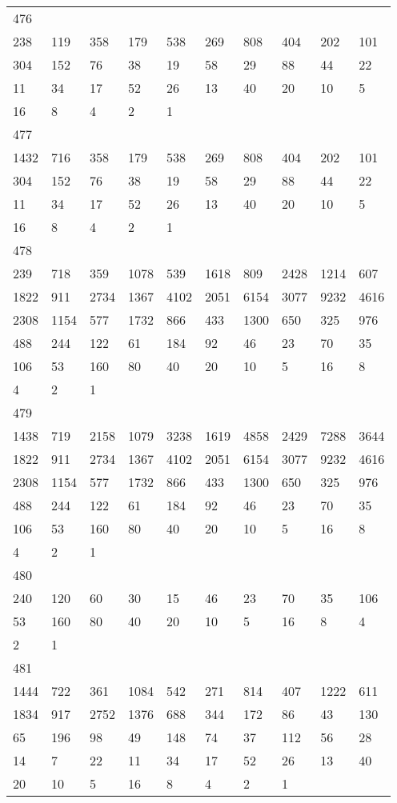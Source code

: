 \begin{longtable}{*{10}{l}}
476&&&&&&&&&\\
238& 119& 358& 179& 538& 269& 808& 404& 202& 101\\
304& 152& 76& 38& 19& 58& 29& 88& 44& 22\\
11& 34& 17& 52& 26& 13& 40& 20& 10& 5\\
16& 8& 4& 2& 1& \\

477&&&&&&&&&\\
1432& 716& 358& 179& 538& 269& 808& 404& 202& 101\\
304& 152& 76& 38& 19& 58& 29& 88& 44& 22\\
11& 34& 17& 52& 26& 13& 40& 20& 10& 5\\
16& 8& 4& 2& 1& \\

478&&&&&&&&&\\
239& 718& 359& 1078& 539& 1618& 809& 2428& 1214& 607\\
1822& 911& 2734& 1367& 4102& 2051& 6154& 3077& 9232& 4616\\
2308& 1154& 577& 1732& 866& 433& 1300& 650& 325& 976\\
488& 244& 122& 61& 184& 92& 46& 23& 70& 35\\
106& 53& 160& 80& 40& 20& 10& 5& 16& 8\\
4& 2& 1& \\

479&&&&&&&&&\\
1438& 719& 2158& 1079& 3238& 1619& 4858& 2429& 7288& 3644\\
1822& 911& 2734& 1367& 4102& 2051& 6154& 3077& 9232& 4616\\
2308& 1154& 577& 1732& 866& 433& 1300& 650& 325& 976\\
488& 244& 122& 61& 184& 92& 46& 23& 70& 35\\
106& 53& 160& 80& 40& 20& 10& 5& 16& 8\\
4& 2& 1& \\

480&&&&&&&&&\\
240& 120& 60& 30& 15& 46& 23& 70& 35& 106\\
53& 160& 80& 40& 20& 10& 5& 16& 8& 4\\
2& 1& \\

481&&&&&&&&&\\
1444& 722& 361& 1084& 542& 271& 814& 407& 1222& 611\\
1834& 917& 2752& 1376& 688& 344& 172& 86& 43& 130\\
65& 196& 98& 49& 148& 74& 37& 112& 56& 28\\
14& 7& 22& 11& 34& 17& 52& 26& 13& 40\\
20& 10& 5& 16& 8& 4& 2& 1& \\


\end{longtable}
